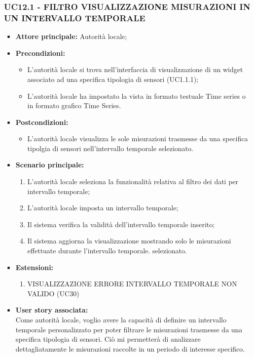 \subsubsection{UC12.1 - FILTRO VISUALIZZAZIONE MISURAZIONI IN UN INTERVALLO TEMPORALE}
\begin{itemize}
    \item \textbf{Attore principale:} Autorità locale;
    \item \textbf{Precondizioni:}
        \begin{itemize}
            \item L'autorità locale si trova nell'interfaccia di visualizzazione di un widget associato ad una specifica tipologia di sensori (UC1.1.1); 
            \item L'autorità locale ha impostato la vista in formato testuale Time series o in formato grafico Time Series.
        \end{itemize}
    \item \textbf{Postcondizioni:}
        \begin{itemize}
            \item L'autorità locale visualizza le sole misurazioni trasmesse da una specifica tipolgia di sensori nell'intervallo temporale selezionato.
        \end{itemize}
    \item \textbf{Scenario principale:}
        \begin{enumerate}
            \item L'autorità locale seleziona la funzionalità relativa al filtro dei dati per intervallo temporale;
            \item L'autorità locale imposta un intervallo temporale;
            \item Il sistema verifica la validità dell'intervallo temporale inserito;
            \item Il sistema aggiorna la visualizzazione mostrando solo le misurazioni effettuate durante l'intervallo temporale. selezionato.
        \end{enumerate}
    \item \textbf{Estensioni:}
    \begin{enumerate}
        \item VISUALIZZAZIONE ERRORE INTERVALLO TEMPORALE NON VALIDO (UC30)
    \end{enumerate}
    \item \textbf{User story associata:} \\
        Come autorità locale, voglio avere la capacità di definire un intervallo temporale personalizzato per poter filtrare le misurazioni trasmesse da una specifica tipologia di sensori. Ciò mi permetterà di analizzare dettagliatamente le misurazioni raccolte in un periodo di interesse specifico.
\end{itemize}